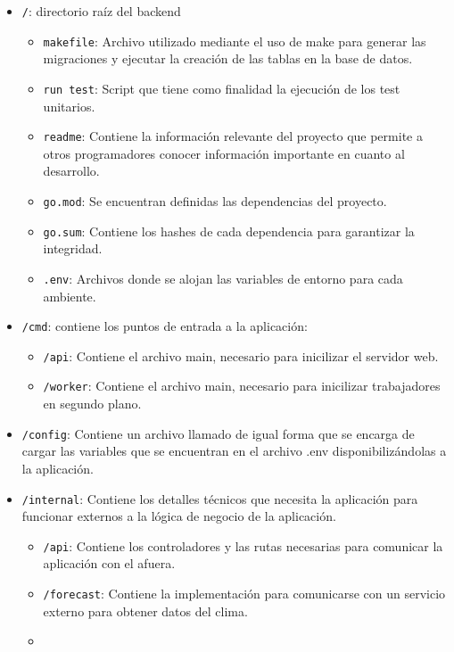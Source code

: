 \begin{itemize}
\tightlist
\item
  \texttt{/}: directorio raíz del backend
  \begin{itemize}
  \tightlist
  \item 
    \texttt{makefile}: Archivo utilizado mediante el uso de make para generar las migraciones y ejecutar la creación de las tablas en la base de datos. 
  \item 
    \texttt{run test}: Script que tiene como finalidad la ejecución de los test unitarios.
  \item 
   \texttt{readme}: Contiene la información relevante del proyecto que permite a otros programadores conocer información importante en cuanto al desarrollo.
   \item 
   \texttt{go.mod}: Se encuentran definidas las dependencias del proyecto.
    \item 
   \texttt{go.sum}: Contiene los hashes de cada dependencia para garantizar la integridad.
   \item 
   \texttt{.env}: Archivos donde se alojan las variables de entorno para cada ambiente.
\end{itemize}
\item
  \texttt{/cmd}: contiene los puntos de entrada a la aplicación:
  \begin{itemize}
  \tightlist
  \item 
    \texttt{/api}: Contiene el archivo main, necesario para inicilizar el servidor web. 
  \item  
    \texttt{/worker}: Contiene el archivo main, necesario para inicilizar trabajadores en segundo plano.
    \end{itemize}
    \item
  \texttt{/config}: Contiene un archivo llamado de igual forma que se encarga de cargar las variables que se encuentran en el archivo .env disponibilizándolas a la aplicación.
  \item
  \texttt{/internal}: Contiene los detalles técnicos que necesita la aplicación para funcionar externos a la lógica de negocio de la aplicación.
  \begin{itemize}
  \tightlist
  \item 
    \texttt{/api}: Contiene los controladores y las rutas necesarias para comunicar la aplicación con el afuera.
  \item  
    \texttt{/forecast}: Contiene la implementación para comunicarse con un servicio externo para obtener datos del clima.
  \item  

\end{itemize}
\end{itemize}
